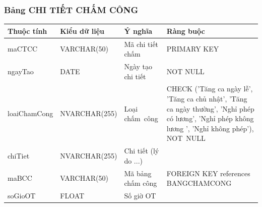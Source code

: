 \documentclass[a4paper,12pt]{report}
\begin{document}
\subsubsection{Bảng CHI TIẾT CHẤM CÔNG}
\noindent
\begin{center}
    \begin{longtable}{|>{\centering\arraybackslash}p{3cm}|
        >{\centering\arraybackslash}p{4cm}|
        >{\centering\arraybackslash}p{3.5cm}|
        >{\centering\arraybackslash}p{4.5cm}|}
        \hline
        \textbf{Thuộc tính}                                                                                                               &
        \textbf{Kiểu dữ liệu}                                                                                                                             &
        \textbf{Ý nghĩa}                                                                                                 &
        \textbf{Ràng buộc}                                                                                                         \\
        \hline
        maCTCC &  VARCHAR(50)  & Mã chi tiết chấm & PRIMARY KEY \\
        \hline
        ngayTao &  DATE  & Ngày tạo chi tiết & NOT NULL \\                                                                                                                          
        \hline
        loaiChamCong &  NVARCHAR(255)  & Loại chấm~công & CHECK ('Tăng ca ngày lễ', 'Tăng ca chủ nhật', 'Tăng ca ngày thường', 'Nghỉ phép có lương', 'Nghỉ phép không lương ', 'Nghỉ không phép'), NOT~NULL \\                                                                                                                          
        \hline
        chiTiet &  NVARCHAR(255)  & Chi tiết (lý do ...) & \\                                                                                                                          
        \hline
        maBCC &  VARCHAR(50)  & Mã bảng chấm công & FOREIGN KEY references BANGCHAMCONG \\                                                                                                                          
        \hline
        soGioOT &  FLOAT  & Số giờ OT & \\                                                                                                                          
        \hline
    \end{longtable}
\end{center}
\end{document}
